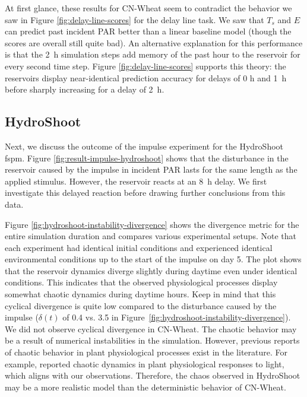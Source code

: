 At first glance, these results for CN-Wheat seem to contradict the behavior we saw in Figure \ref{fig:delay-line-scores} for the delay line task.
We saw that $T_s$ and $E$ can predict past incident PAR better than a linear baseline model (though the scores are overall still quite bad).
An alternative explanation for this performance is that the \SI{2}{\hour} simulation steps add memory of the past hour to the reservoir for every second time step.
Figure \ref{fig:delay-line-scores} supports this theory: the reservoirs display near-identical prediction accuracy for delays of 0 h and \SI{1}{\hour} before sharply increasing for a delay of \SI{2}{\hour}.



\subsection{HydroShoot} \label{sec:results-impulse-hydroshoot}

Next, we discuss the outcome of the impulse experiment for the HydroShoot \acrshort{fspm}.
Figure \ref{fig:result-impulse-hydroshoot} shows that the disturbance in the reservoir caused by the impulse in incident PAR lasts for the same length as the applied stimulus. However, the reservoir reacts at an \SI{8}{\hour} delay.
We first investigate this delayed reaction before drawing further conclusions from this data.


Figure \ref{fig:hydroshoot-instability-divergence} shows the divergence metric for the entire simulation duration and compares various experimental setups.
Note that each experiment had identical initial conditions and experienced identical environmental conditions up to the start of the impulse on day 5.
The plot shows that the reservoir dynamics diverge slightly during daytime even under identical conditions.
This indicates that the observed physiological processes display somewhat chaotic dynamics during daytime hours.
Keep in mind that this cyclical divergence is quite low compared to the disturbance caused by the impulse ($\delta(t)$ of 0.4 vs. 3.5 in \mbox{Figure \ref{fig:hydroshoot-instability-divergence}}).
We did not observe cyclical divergence in CN-Wheat.
The chaotic behavior may be a result of numerical instabilities in the simulation.
However, previous reports of chaotic behavior in plant physiological processes exist in the literature.
For example, \citet{shabala_observations_1997} reported chaotic dynamics in plant physiological responses to light, which aligns with our observations.
Therefore, the chaos observed in HydroShoot may be a more realistic model than the deterministic behavior of CN-Wheat.


